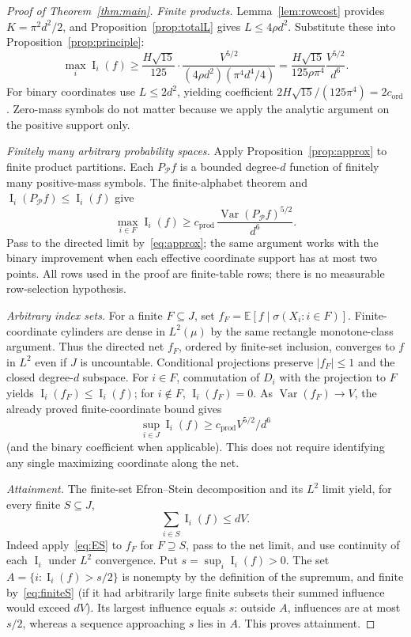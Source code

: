 \documentclass[11pt]{article}
\numberwithin{equation}{section}
\theoremstyle{remark}
\newcommand{\E}{\mathbb E}
\newcommand{\Var}{\operatorname{Var}}
\newcommand{\Inf}{\operatorname{I}}
\newcommand{\cprod}{c_{\mathrm{prod}}}
\newcommand{\cord}{c_{\mathrm{ord}}}
\begin{document}
\begin{proof}[Proof of Theorem~\ref{thm:main}]
\emph{Finite products.} Lemma~\ref{lem:rowcost} provides $K=\pi^2d^2/2$, and Proposition~\ref{prop:totalL} gives $L\le4\rho d^2$. Substitute these into Proposition~\ref{prop:principle}:
\[
 \max_i\Inf_i(f)\ge\frac{H\sqrt{15}}{125}\cdot
 \frac{V^{5/2}}{(4\rho d^2)(\pi^4d^4/4)}
 =\frac{H\sqrt{15}}{125\rho\pi^4}\frac{V^{5/2}}{d^6}.
\]
For binary coordinates use $L\le2d^2$, yielding coefficient $2H\sqrt{15}/(125\pi^4)=2\cord$. Zero-mass symbols do not matter because we apply the analytic argument on the positive support only.

\emph{Finitely many arbitrary probability spaces.}
Apply Proposition~\ref{prop:approx} to finite product partitions. Each
$P_{\mathcal P}f$ is a bounded degree-$d$ function of finitely many
positive-mass symbols. The finite-alphabet theorem and
$\Inf_i(P_{\mathcal P}f)\le\Inf_i(f)$ give
\[
 \max_{i\in F}\Inf_i(f)\ge\cprod\,
 \frac{\operatorname{Var}(P_{\mathcal P}f)^{5/2}}{d^6}.
\]
Pass to the directed limit by~\eqref{eq:approx}; the same argument works
with the binary improvement when each effective coordinate support has
at most two points. All rows used in the proof are finite-table rows;
there is no measurable row-selection hypothesis.

\emph{Arbitrary index sets.} For a finite $F\subseteq J$, set $f_F=\E[f\mid\sigma(X_i:i\in F)]$. Finite-coordinate cylinders are dense in $L^2(\mu)$ by the same rectangle monotone-class argument. Thus the directed net $f_F$, ordered by finite-set inclusion, converges to $f$ in $L^2$ even if $J$ is uncountable. Conditional projections preserve $|f_F|\le1$ and the closed degree-$d$ subspace. For $i\in F$, commutation of $D_i$ with the projection to $F$ yields
$\Inf_i(f_F)\le\Inf_i(f)$; for $i\notin F$, $\Inf_i(f_F)=0$. As $\Var(f_F)\to V$, the already proved finite-coordinate bound gives
\[
 \sup_{i\in J}\Inf_i(f)\ge\cprod V^{5/2}/d^6
\]
(and the binary coefficient when applicable). This does not require identifying any single maximizing coordinate along the net.

\emph{Attainment.} The finite-set Efron--Stein decomposition and its $L^2$ limit yield, for every finite $S\subseteq J$,
\begin{equation}\label{eq:finiteS}
 \sum_{i\in S}\Inf_i(f)\le dV.
\end{equation}
Indeed apply~\eqref{eq:ES} to $f_F$ for $F\supseteq S$, pass to the net limit, and use continuity of each $\Inf_i$ under $L^2$ convergence. Put $s=\sup_i\Inf_i(f)>0$. The set $A=\{i:\Inf_i(f)>s/2\}$ is nonempty by the definition of the supremum, and finite by~\eqref{eq:finiteS} (if it had arbitrarily large finite subsets their summed influence would exceed $dV$). Its largest influence equals $s$: outside $A$, influences are at most $s/2$, whereas a sequence approaching $s$ lies in $A$. This proves attainment.


\end{proof}
\end{document}
